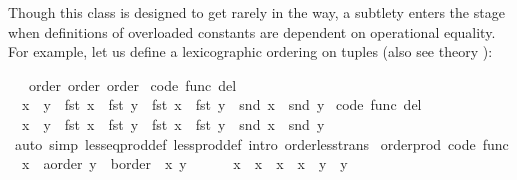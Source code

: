 \begin{isabellebody}
\begin{isamarkuptext}
  Though this  class is designed to get rarely in
  the way, a subtlety
  enters the stage when definitions of overloaded constants
  are dependent on operational equality.  For example, let
  us define a lexicographic ordering on tuples
  (also see theory \hyperlink{theory.Product-ord}{\mbox{}}):%
\end{isamarkuptext}%
\isamarkuptrue%
%
\isadelimquoteme
%
\endisadelimquoteme
%
\isatagquoteme
{}\isamarkupfalse%
\ {\isachardoublequoteopen}{\isacharasterisk}{\isachardoublequoteclose}\ {\isacharcolon}{\isacharcolon}\ {\isacharparenleft}order{\isacharcomma}\ order{\isacharparenright}\ order\isanewline
{}\isanewline
\isanewline
{}\isamarkupfalse%
\ {\isacharbrackleft}code\ func\ del{\isacharbrackright}{\isacharcolon}\isanewline
\ \ {\isachardoublequoteopen}x\ {\isasymle}\ y\ {\isasymlongleftrightarrow}\ fst\ x\ {\isacharless}\ fst\ y\ {\isasymor}\ fst\ x\ {\isacharequal}\ fst\ y\ {\isasymand}\ snd\ x\ {\isasymle}\ snd\ y{\isachardoublequoteclose}\isanewline
\isanewline
{}\isamarkupfalse%
\ {\isacharbrackleft}code\ func\ del{\isacharbrackright}{\isacharcolon}\isanewline
\ \ {\isachardoublequoteopen}x\ {\isacharless}\ y\ {\isasymlongleftrightarrow}\ fst\ x\ {\isacharless}\ fst\ y\ {\isasymor}\ fst\ x\ {\isacharequal}\ fst\ y\ {\isasymand}\ snd\ x\ {\isacharless}\ snd\ y{\isachardoublequoteclose}\isanewline
\isanewline
{}\isamarkupfalse%
\ \isamarkupfalse%
\isanewline
{}\isamarkupfalse%
\ {\isacharparenleft}auto\ simp{\isacharcolon}\ less{\isacharunderscore}eq{\isacharunderscore}prod{\isacharunderscore}def\ less{\isacharunderscore}prod{\isacharunderscore}def\ intro{\isacharcolon}\ order{\isacharunderscore}less{\isacharunderscore}trans{\isacharparenright}\isanewline
\isanewline
{}\isamarkupfalse%
\isanewline
\isanewline
{}\isamarkupfalse%
\ order{\isacharunderscore}prod\ {\isacharbrackleft}code\ func{\isacharbrackright}{\isacharcolon}\isanewline
\ \ {\isachardoublequoteopen}{\isacharparenleft}x{}\ {\isasymColon}\ {\isacharprime}a{\isasymColon}order{\isacharcomma}\ y{}\ {\isasymColon}\ {\isacharprime}b{\isasymColon}order{\isacharparenright}\ {\isacharless}\ {\isacharparenleft}x{}{\isacharcomma}\ y{}{\isacharparenright}\ {\isasymlongleftrightarrow}\isanewline
\ \ \ \ \ x{}\ {\isacharless}\ x{}\ {\isasymor}\ x{}\ {\isacharequal}\ x{}\ {\isasymand}\ y{}\ {\isacharless}\ y{}{\isachardoublequoteclose}\isanewline

\end{isabellebody}
